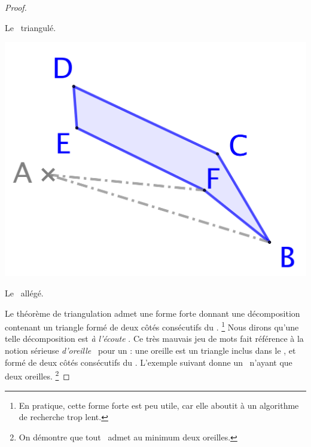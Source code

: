 \begin{proof}
\begin{multicols}{3}
\begin{center}
            \smallskip
            Le \ngone\ triangulé.
        \end{center}


        \begin{center}
            \includegraphics[scale=.35]{content/polygon/alg-area/triangulation-3.png}

            \smallskip
            Le \ngone\ allégé.
        \end{center}
    \end{multicols}


    Le théorème de triangulation admet une forme forte donnant une décomposition contenant un triangle formé de deux côtés consécutifs du \ngone.%
    \footnote{
        En pratique, cette forme forte est peu utile, car elle aboutit à un algorithme de recherche trop lent.
    }
    Nous dirons qu'une telle décomposition est \og \emph{à l'écoute} \fg.
    Ce très mauvais jeu de mots fait référence à la notion sérieuse \og \emph{d'oreille} \fg\ pour un \ngone: une oreille est un triangle inclus dans le \ngone, et formé de deux côtés consécutifs du \ngone.
    L'exemple suivant donne un \ngone\ n'ayant que deux oreilles.%
    \footnote{
        On démontre que tout \ngone\ admet au minimum deux oreilles.
    }



\end{proof}
